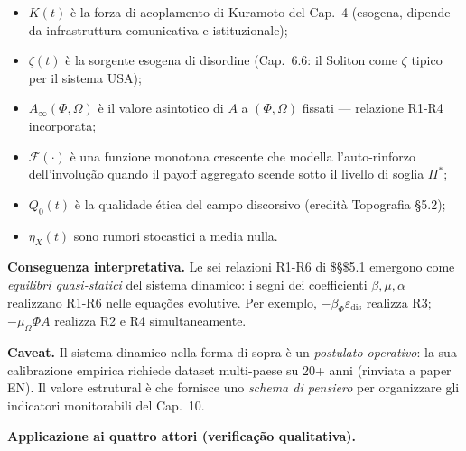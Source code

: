 \begin{itemize}
\tightlist
\item
  \(K(t)\) è la forza di acoplamento di Kuramoto del Cap.~4 (esogena,
  dipende da infrastruttura comunicativa e istituzionale);
\item
  \(\zeta(t)\) è la sorgente esogena di disordine (Cap.~6.6: il Soliton
  come \(\zeta\) tipico per il sistema USA);
\item
  \(A_\infty(\Phi, \Omega)\) è il valore asintotico di \(A\) a
  \((\Phi, \Omega)\) fissati --- relazione R1-R4 incorporata;
\item
  \(\mathcal{F}(\cdot)\) è una funzione monotona crescente che modella
  l'auto-rinforzo dell'involução quando il payoff aggregato scende
  sotto il livello di soglia \(\Pi^*\);
\item
  \(Q_0(t)\) è la qualidade ética del campo discorsivo (eredità Topografia
  \S{}5.2);
\item
  \(\eta_X(t)\) sono rumori stocastici a media nulla.
\end{itemize}

\Proved{} \textbf{Conseguenza interpretativa.} Le sei relazioni R1-R6 di
\$\S\$5.1 emergono come \emph{equilibri quasi-statici} del sistema
dinamico: i segni dei coefficienti \(\beta, \mu, \alpha\) realizzano
R1-R6 nelle equações evolutive. Per exemplo,
\(-\beta_\Phi \varepsilon_{\text{dis}}\) realizza R3;
\(-\mu_\Omega \Phi A\) realizza R2 e R4 simultaneamente.

\Conj{} \textbf{Caveat.} Il sistema dinamico nella forma di sopra è un
\emph{postulato operativo}: la sua calibrazione empirica richiede
dataset multi-paese su 20+ anni (rinviata a paper EN). Il valore
estrutural è che fornisce uno \emph{schema di pensiero} per organizzare
gli indicatori monitorabili del Cap.~10.

\Hypoth{} \textbf{Applicazione ai quattro attori (verificação
qualitativa).}

